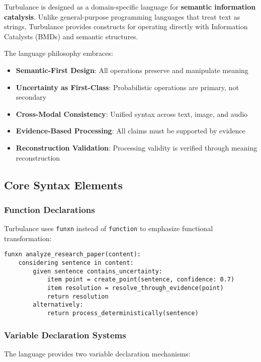 \documentclass[12pt,a4paper,twoside]{article}
\begin{document}
\begin{itemize}
Turbulance is designed as a domain-specific language for \textbf{semantic information catalysis}. Unlike general-purpose programming languages that treat text as strings, Turbulance provides constructs for operating directly with Information Catalysts (BMDs) and semantic structures.

The language philosophy embraces:
\begin{itemize}
\item \textbf{Semantic-First Design}: All operations preserve and manipulate meaning
\item \textbf{Uncertainty as First-Class}: Probabilistic operations are primary, not secondary
\item \textbf{Cross-Modal Consistency}: Unified syntax across text, image, and audio
\item \textbf{Evidence-Based Processing}: All claims must be supported by evidence
\item \textbf{Reconstruction Validation}: Processing validity is verified through meaning reconstruction
\end{itemize}

\subsection{Core Syntax Elements}

\subsubsection{Function Declarations}

Turbulance uses \texttt{funxn} instead of \texttt{function} to emphasize functional transformation:

\begin{lstlisting}[caption=Turbulance Function Syntax]
funxn analyze_research_paper(content):
    considering sentence in content:
        given sentence contains_uncertainty:
            item point = create_point(sentence, confidence: 0.7)
            item resolution = resolve_through_evidence(point)
            return resolution
        alternatively:
            return process_deterministically(sentence)
\end{lstlisting}

\subsubsection{Variable Declaration Systems}

The language provides two variable declaration mechanisms:


\end{itemize}
\end{document}
